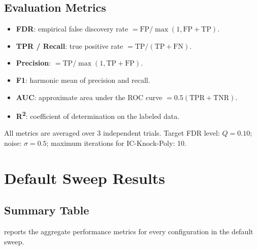 \documentclass[12pt,a4paper]{article}
\begin{document}
\subsection{Evaluation Metrics}

\begin{itemize}
  \item \textbf{FDR}: empirical false discovery rate
        \(= \mathrm{FP}/\max(1,\mathrm{FP}+\mathrm{TP})\).
  \item \textbf{TPR / Recall}: true positive rate
        \(= \mathrm{TP}/(\mathrm{TP}+\mathrm{FN})\).
  \item \textbf{Precision}: \(= \mathrm{TP}/\max(1,\mathrm{TP}+\mathrm{FP})\).
  \item \textbf{F1}: harmonic mean of precision and recall.
  \item \textbf{AUC}: approximate area under the ROC curve
        \(= 0.5(\mathrm{TPR} + \mathrm{TNR})\).
  \item \textbf{R\textsuperscript{2}}: coefficient of determination on
        the labeled data.
\end{itemize}

All metrics are averaged over 3 independent trials.
Target FDR level: \(Q = 0.10\);
noise: \(\sigma = 0.5\);
maximum iterations for IC-Knock-Poly: 10.

\section{Default Sweep Results}
\label{sec:default}

\subsection{Summary Table}

 reports the aggregate performance metrics for every
configuration in the default sweep.
\end{document}
